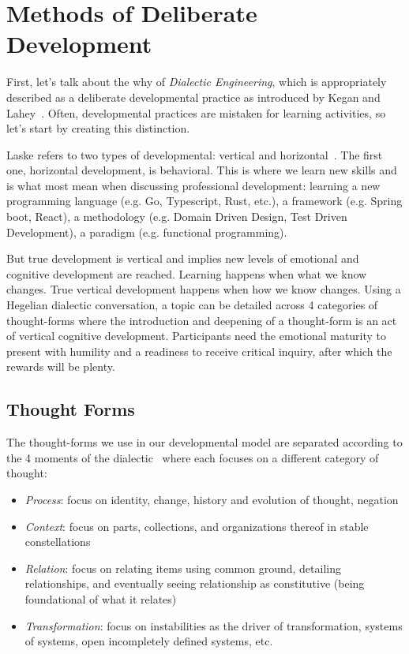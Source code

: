 \section{Methods of Deliberate Development}

First, let's talk about the why of \emph{Dialectic Engineering}, which is appropriately described as a deliberate
developmental practice as introduced by Kegan and Lahey~\citep{kegan2016everyone}.
Often, developmental practices are mistaken for learning activities, so let's start by creating this distinction.

Laske refers to two types of developmental: vertical and horizontal~\citep{laske_MHD_vol_II}.
The first one, horizontal development, is behavioral.
This is where we learn new skills and is what most mean when discussing professional development: learning a new programming language (e.g. Go,
Typescript, Rust, etc.), a framework (e.g. Spring boot, React), a methodology (e.g. Domain Driven Design, Test Driven
Development), a paradigm (e.g. functional programming).

But true development is vertical and implies new levels of emotional and cognitive development are reached.
Learning happens when what we know changes.
True vertical development happens when how we know changes.
Using a Hegelian dialectic conversation, a topic can be detailed across 4 categories of thought-forms where the
introduction and deepening of a thought-form is an act of vertical cognitive development.
Participants need the emotional maturity to present with humility and a readiness to receive critical inquiry, after
which the rewards will be plenty.

\subsection{Thought Forms}

The thought-forms we use in our developmental model are separated according to the 4 moments of the dialectic~\citep{
    laske_2023_4_moments} where each focuses on a different category of thought:

\begin{itemize}
    \item \emph{Process}: focus on identity, change, history and evolution of thought, negation
    \item \emph{Context}: focus on parts, collections, and organizations thereof in stable constellations
    \item \emph{Relation}: focus on relating items using common ground, detailing relationships, and eventually
    seeing relationship as constitutive (being foundational of what it relates)
    \item \emph{Transformation}: focus on instabilities as the driver of transformation, systems of systems, open
    incompletely defined systems, etc.
\end{itemize}


